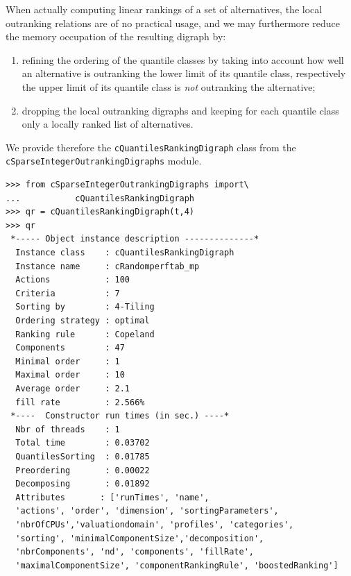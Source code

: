 When actually computing linear rankings of a set of alternatives, the local outranking relations are of no practical usage, and we may furthermore reduce the memory occupation of the resulting digraph by:
\begin{enumerate}[topsep=1pt]
\item refining the ordering of the quantile classes by taking into account how well an alternative is outranking the lower limit of its quantile class, respectively the upper limit of its quantile class is \emph{not} outranking the alternative;
\item dropping the local outranking digraphs and keeping for each quantile class only a locally ranked list of alternatives.
\end{enumerate}

We provide therefore the \texttt{cQuantilesRankingDigraph} class from the \texttt{cSparseIntegerOutrankingDigraphs} module.
\begin{lstlisting}[caption={Ranking the sparse integer outranking digraph},label=list:11.5]
>>> from cSparseIntegerOutrankingDigraphs import\
...           cQuantilesRankingDigraph
>>> qr = cQuantilesRankingDigraph(t,4)
>>> qr
 *----- Object instance description --------------*
  Instance class    : cQuantilesRankingDigraph
  Instance name     : cRandomperftab_mp
  Actions           : 100
  Criteria          : 7
  Sorting by        : 4-Tiling
  Ordering strategy : optimal
  Ranking rule      : Copeland
  Components        : 47
  Minimal order     : 1
  Maximal order     : 10
  Average order     : 2.1
  fill rate         : 2.566%
 *----  Constructor run times (in sec.) ----*
  Nbr of threads    : 1
  Total time        : 0.03702
  QuantilesSorting  : 0.01785
  Preordering       : 0.00022
  Decomposing       : 0.01892
  Attributes       : ['runTimes', 'name',
  'actions', 'order', 'dimension', 'sortingParameters',
  'nbrOfCPUs','valuationdomain', 'profiles', 'categories',
  'sorting', 'minimalComponentSize','decomposition',
  'nbrComponents', 'nd', 'components', 'fillRate',
  'maximalComponentSize', 'componentRankingRule', 'boostedRanking']
\end{lstlisting}

